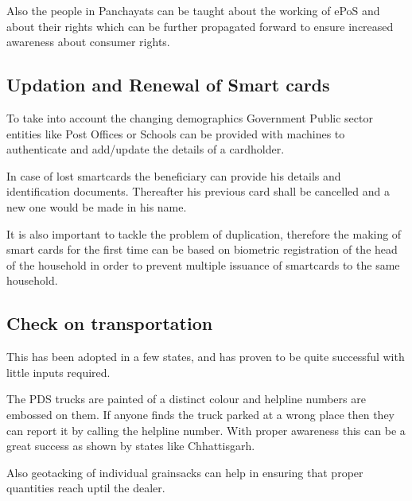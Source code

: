 \documentclass[a4paper,12pt,openany]{book}
\begin{document}
Also the people in Panchayats can be taught about the working of ePoS and about their rights which can be further propagated forward to ensure increased awareness about consumer rights.

\subsection{Updation and Renewal of Smart cards}
To take into account the changing demographics Government Public sector entities like Post Offices or Schools can be provided with machines to authenticate and add/update the details of a cardholder.

In case of lost smartcards the beneficiary can provide his details and identification documents. Thereafter his previous card shall be cancelled and a new one would be made in his name.

It is also important to tackle the problem of duplication, therefore the making of smart cards for the first time can be based on biometric registration of the head of the household in order to prevent multiple issuance of smartcards to the same household.

\subsection{Check on transportation}
This has been adopted in a few states, and has proven to be quite successful with little inputs required.

The PDS trucks are painted of a distinct colour and helpline numbers are embossed on them. If anyone finds the truck parked at a wrong place then they can report it by calling the helpline number. With proper awareness this can be a great success as shown by states like Chhattisgarh. 

Also geotacking of individual grainsacks can help in ensuring that proper quantities reach uptil the dealer.
\end{document}
